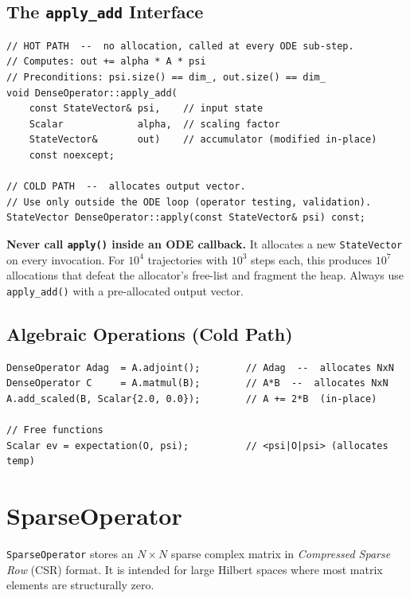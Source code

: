 \documentclass[11pt,a4paper,twoside]{book}
\newcommand{\code}[1]{\texttt{\small#1}}
\theoremstyle{definition}
\theoremstyle{remark}
\begin{document}
\subsection{The \texttt{apply\_add} Interface}
\label{subsec:apply-add}

\begin{verbatim}
// HOT PATH  --  no allocation, called at every ODE sub-step.
// Computes: out += alpha * A * psi
// Preconditions: psi.size() == dim_, out.size() == dim_
void DenseOperator::apply_add(
    const StateVector& psi,    // input state
    Scalar             alpha,  // scaling factor
    StateVector&       out)    // accumulator (modified in-place)
    const noexcept;

// COLD PATH  --  allocates output vector.
// Use only outside the ODE loop (operator testing, validation).
StateVector DenseOperator::apply(const StateVector& psi) const;
\end{verbatim}

\begin{warnbox}
  \textbf{Never call \code{apply()} inside an ODE callback.}
  It allocates a new \code{StateVector} on every invocation.
  For $10^4$ trajectories with $10^3$ steps each, this produces
  $10^7$ allocations that defeat the allocator's free-list and
  fragment the heap. Always use \code{apply\_add()} with a
  pre-allocated output vector.
\end{warnbox}

\subsection{Algebraic Operations (Cold Path)}
\label{subsec:dense-algebra}

\begin{verbatim}
DenseOperator Adag  = A.adjoint();        // Adag  --  allocates NxN
DenseOperator C     = A.matmul(B);        // A*B  --  allocates NxN
A.add_scaled(B, Scalar{2.0, 0.0});        // A += 2*B  (in-place)

// Free functions
Scalar ev = expectation(O, psi);          // <psi|O|psi> (allocates temp)
\end{verbatim}

\section{SparseOperator}
\label{sec:sparseoperator}

\code{SparseOperator} stores an $N \times N$ sparse complex matrix in
\emph{Compressed Sparse Row} (CSR) format. It is intended for large
Hilbert spaces where most matrix elements are structurally zero.
\end{document}
